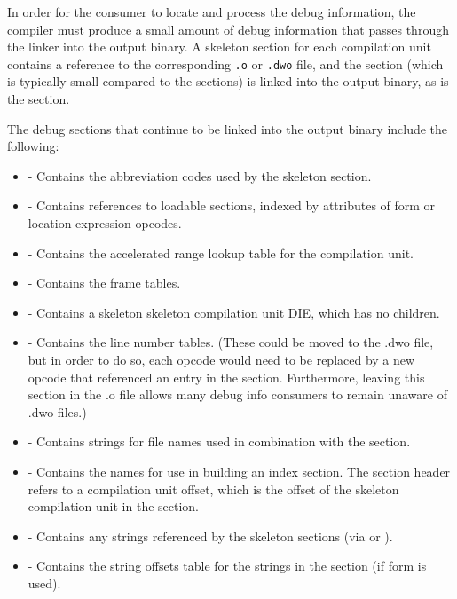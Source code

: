 In order for the consumer to locate and process the debug
information, the compiler must produce a small amount of debug
information that passes through the linker into the output
binary. A skeleton \dotdebuginfo{} section for each compilation unit
contains a reference to the corresponding \texttt{.o} or \texttt{.dwo}
file, and the \dotdebugline{} section (which is typically small
compared to the \dotdebuginfo{} sections) is
linked into the output binary, as is the 
\bbeb
\dotdebugaddr{} section.

The debug sections that continue to be linked into the
output binary include the following:
\begin{itemize}
\item
\dotdebugabbrev{} - Contains the abbreviation codes used by the
skeleton \dotdebuginfo{} section.
\item
\dotdebugaddr{} - Contains references to loadable sections,
indexed by attributes of form \DWFORMaddrx{} or location
expression 
\DWOPaddrx{} opcodes.
\item
\dotdebugaranges{} - Contains the accelerated range lookup table
for the compilation unit.
\item
\dotdebugframe{} - Contains the frame tables.
\item
\dotdebuginfo{} - Contains a skeleton 
\bb
skeleton compilation unit DIE, which has
\eb
no children.
\item
\dotdebugline{} - Contains the line number tables.
(These could be moved to the .dwo file, but in
order to do so, each \DWLNEsetaddress{} opcode would need to
be replaced by a new opcode that referenced an entry in the
\dotdebugaddr{} section. Furthermore, leaving this section in the
.o file allows many debug info consumers to remain unaware of
.dwo files.)
\item
\dotdebuglinestr{} - Contains strings for file names used in
combination with the \dotdebugline{} section.
\item
\dotdebugnames{} - Contains the names for use in
building an index section. 
The section header refers to a
compilation unit offset, which is the offset of the
skeleton compilation unit in the \dotdebuginfo{} section.
\bbeb
\item
\dotdebugstr{} - Contains any strings referenced by the skeleton
\dotdebuginfo{} sections (via \DWFORMstrp{} or \DWFORMstrx{}).
\item
\dotdebugstroffsets{} - Contains the string offsets table for
the strings in the \dotdebugstr{} section (if form \DWFORMstrx{} is used).
\end{itemize}

